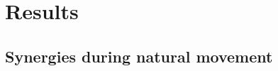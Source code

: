 \chapter{Results} %
\label{sg:cha:results}

\section{Synergies during natural movement} %
\label{sg:sec:nat_mov_syns}


